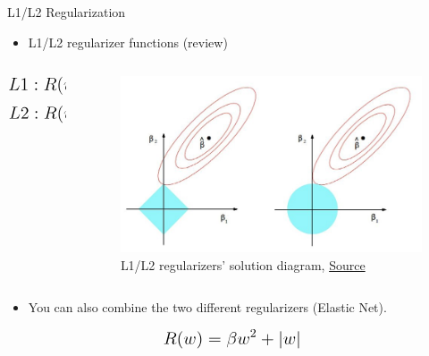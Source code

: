 \documentclass[compress,oilve,t]{beamer}
\begin{document}
\begin{frame}{L1/L2 Regularization}
	\begin{itemize}
		\item L1/L2 regularizer functions (review)
	\end{itemize}
	\begin{columns}
		\begin{column}[c]{0.5\textwidth}
			\centering
			\begin{equation*}
				\centering
				\mathlarger{\mathlarger{
						L1: R(w) = \vert w\vert
				}}
			\end{equation*}
			\begin{equation*}
				\centering
				\mathlarger{\mathlarger{
						L2: R(w) = w^2
				}}
			\end{equation*}
		\end{column}
		\begin{column}[c]{0.5\textwidth}
			\begin{figure}[H]
				\centering
				\includegraphics[width=\textwidth]{Figs/section_4/l1l2_reg.jpeg}
				\caption{L1/L2 regularizers' solution diagram, \href{https://towardsdatascience.com/understanding-l1-and-l2-regularization-93918a5ac8d0}{Source}}
			\end{figure}
		\end{column}
	\end{columns}
	
	\begin{itemize}
		\item You can also combine the two different regularizers (Elastic Net).
	\end{itemize}
	\vspace{0.05\textheight}
	\begin{equation*}
		\mathlarger{\mathlarger{
				R(w) = \beta w^2 + \vert w\vert
		}}
	\end{equation*}
\end{frame}
\end{document}
